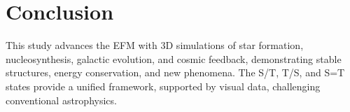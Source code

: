 \documentclass[11pt]{article}
\begin{document}
\section{Conclusion}
This study advances the EFM with 3D simulations of star formation, nucleosynthesis, galactic evolution, and cosmic feedback, demonstrating stable structures, energy conservation, and new phenomena. The S/T, T/S, and S=T states provide a unified framework, supported by visual data, challenging conventional astrophysics.
\end{document}
